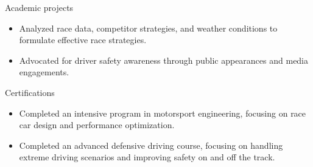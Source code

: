 \documentclass{resume} %
\begin{document}
        \begin{workSection}{Academic projects}
            
                \customItem[
                    title=Race Strategy Analysis and Execution,
                    organization=Red Bull Racing, UK,
                    duration=2022- Present
                ]
                
                \begin{itemize}
                    \itemsep -6pt {}\item Analyzed race data, competitor strategies, and weather conditions to formulate effective race strategies.
                \end{itemize}
            
                \customItem[
                    title=Driver Safety Advocacy Campaign,
                    organization=Red Bull Racing, UK,
                    duration=2021 - 2022
                ]
                
                \begin{itemize}
                    \itemsep -6pt {}\item Advocated for driver safety awareness through public appearances and media engagements.
                \end{itemize}
             

        \end{workSection}  
        \begin{workSection}  {Certifications}
            
                    \customItem[
                        title=Advanced Motorsport Engineering Certificate,
                        organization=F1 Motor Sport,
                        duration=Sept 22- Dec 2023
                    ]
                    
                    \begin{itemize}
                        \itemsep -6pt {}\item Completed an intensive program in motorsport engineering, focusing on race car design and performance optimization.
                    \end{itemize}
                
                    \customItem[
                        title=Advanced Defensive Driving Certificate,
                        organization=Scuderia Toro Rosso,
                        duration=Sept 16 - Oct 16
                    ]
                    
                    \begin{itemize}
                        \itemsep -6pt {}\item Completed an advanced defensive driving course, focusing on handling extreme driving scenarios and improving safety on and off the track.
                    \end{itemize}
                
            
        \end{workSection}

        
\end{document}
